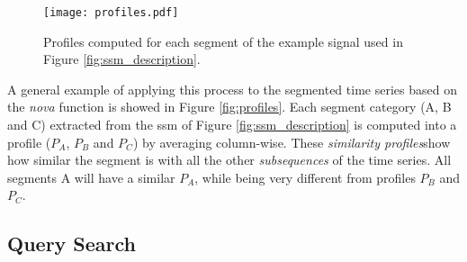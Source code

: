 \begin{figure}
\centering
\texttt{[image: profiles.pdf]}
\caption{Profiles computed for each segment of the example signal used in Figure \ref{fig:ssm_description}.}
\end{figure}

A general example of applying this process to the segmented time series based on the \textit{nova} function is showed in Figure \ref{fig:profiles}. Each segment category (A, B and C) extracted from the \gls{ssm} of Figure \ref{fig:ssm_description} is computed into a profile ($P_A$, $P_B$ and $P_C$) by averaging column-wise. These \textit{similarity profiles}show how similar the segment is with all the other \textit{subsequences} of the time series. All segments A will have a similar $P_A$, while being very different from profiles $P_B$ and $P_C$. 

\subsection{Query Search}
\label{subsec:query_based}

